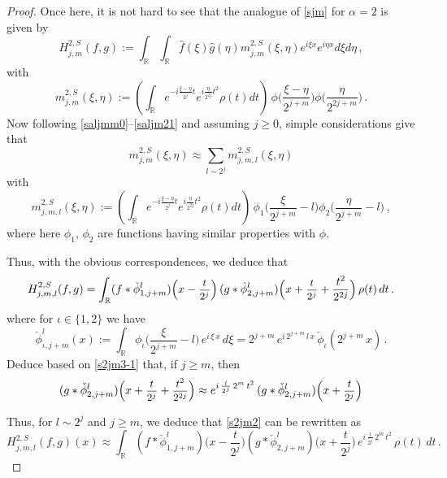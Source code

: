\documentclass[a4paper,reqno]{amsart}
\numberwithin{equation}{section}
\theoremstyle{definition}
\newcommand{\R}{\mathbb{R}}
\newcommand{\sdfrac}[2]{\mbox{\small$\displaystyle\frac{#1}{#2}$}}
\def\a{\alpha}
\begin{document}
\begin{proof}
Once here, it is not hard to see that the analogue of \eqref{sjm} for $\a=2$ is given by
	\begin{equation}\label{s2jm}
		H^{2,S}_{j,m}(f,g):=\int_\R\int_\R \hat{f}(\xi)\hat{g}(\eta)m_{j,m}^{2,S}(\xi,\eta)e^{i\xi x}e^{i\eta x}d\xi d\eta\,,
	\end{equation}
	with
	\begin{equation}\label{s2jmm}
		m_{j,m}^{2,S}(\xi,\eta):=\left(\int_\R e^{-i\frac{\xi-\eta}{2^j}  t}e^{i\frac{\eta}{2^{2j}}t^2}\rho(t)dt\right)\,
		\phi\Big(\frac{\xi-\eta}{2^{j+m}}\Big)\phi\Big(\frac{\eta}{2^{2j+m}}\Big)\,.
	\end{equation}
	Now following \eqref{saljmm0}--\eqref{saljm21} and assuming $j\geq 0$, simple considerations give that
	\begin{equation}\label{s2jmm0}
		m_{j,m}^{2,S}(\xi,\eta)\approx\sum_{l\sim 2^j} m_{j,m,l}^{2,S}(\xi,\eta)
	\end{equation}
	with
	\begin{equation}\label{s2jmm1}
		m_{j,m,l}^{2,S}(\xi,\eta):=\left(\int_\R e^{-i\frac{\xi-\eta}{2^j}  t}e^{i\frac{\eta}{2^{2j}}t^2}\rho(t)dt\right)\,
		\phi_1\Big(\frac{\xi}{2^{j+m}}-l\Big)\phi_2\Big(\frac{\eta}{2^{j+m}}-l\Big)\,,
	\end{equation}
	where here $\phi_1$, $\phi_2$ are functions having similar properties with $\phi$.
	
	Thus, with the obvious correspondences, we deduce that
	\begin{equation}\label{s2jm2}
		H^{2,S}_{j,m,l}(f,g)=\int_{\R}  (f*\check{\phi}_{1,j+m}^l)\Big(x-\sdfrac{t}{2^j}\Big)\,(g*\check{\phi}_{2,j+m}^l)\Big(x+\sdfrac{t}{2^j}+\frac{t^2}{2^{2j}}\Big)\,\rho(t)\,dt\,.
	\end{equation}
	where for $\iota\in\{1,2\}$ we have
	\begin{equation}\label{s2jm3-1}
		\check{\phi}_{\iota,j+m}^l(x):=\int_{\R} \phi_{\iota}\Big(\frac{\xi}{2^{j+m}}-l\Big)\,e^{i\,\xi\,x}\,d\xi=
		2^{j+m}\,e^{i\,2^{j+m}\,l\,x}\,\check{\phi}_{\iota}(2^{j+m}\,x)\,.
	\end{equation}
	Deduce based on \eqref{s2jm3-1} that, if $j\geq m$, then
	\begin{equation}\label{s2jm4ss}
		(g*\check{\phi}_{2,j+m}^l)\Big(x+\sdfrac{t}{2^j}+\sdfrac{t^2}{2^{2j}}\Big)\approx e^{i\,\frac{l}{2^{j}}\,2^m\,t^2}\,(g*\check{\phi}_{2,j+m}^l)\Big(x+\sdfrac{t}{2^j}\Big)
	\end{equation}

Thus, for $l\sim 2^j$ and $j\geq m$, we deduce that \eqref{s2jm2} can be rewritten as
\begin{equation}\label{h2S}
		H^{2,S}_{j,m,l}(f,g)(x)\approx\int_{\R}  (f*\check{\phi}_{1,j+m}^l)\Big(x-\frac{t}{2^j}\Big)
		(g*\check{\phi}_{2,j+m}^l)\Big(x+\frac{t}{2^j}\Big)\,e^{i\,\frac{l}{2^{j}}\,2^m\,t^2}\,\rho(t)\,dt\,.
\end{equation}


\end{proof}
\end{document}
